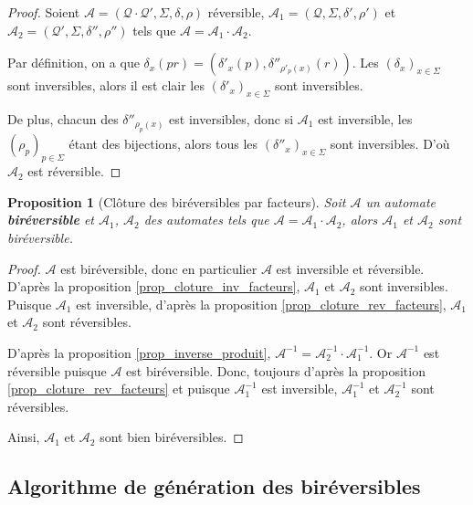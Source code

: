 \documentclass[11pt,a4paper]{article}
\newtheorem{prop}{Proposition}
\begin{document}
\begin{proof}
  Soient $\mathcal{A}=\left(\mathcal{Q\cdot Q'}, \Sigma, \delta, \rho\right)$ réversible, $\mathcal{A}_1=\left(\mathcal{Q}, \Sigma, \delta', \rho'\right)$ et $\mathcal{A}_2=\left(\mathcal{Q'}, \Sigma, \delta'', \rho''\right)$ tels que $\mathcal{A} = \mathcal{A}_1\cdot\mathcal{A}_2$.

  Par définition, on a que $\delta_x(pr) = (\delta'_x(p), \delta''_{\rho'_p(x)}(r))$. Les ${(\delta_x)}_{x\in\Sigma}$ sont inversibles, alors il est clair les ${(\delta'_x)}_{x\in\Sigma}$ sont inversibles.

  De plus, chacun des $\delta''_{\rho_p(x)}$ est inversibles, donc si $\mathcal{A}_1$ est inversible, les ${(\rho_p)}_{p\in\Sigma}$ étant des bijections, alors tous les ${(\delta''_x)}_{x\in\Sigma}$ sont inversibles. D'où $\mathcal{A}_2$ est réversible.
\end{proof}

\begin{prop}[Clôture des biréversibles par facteurs]
  Soit $\mathcal{A}$ un automate \textbf{biréversible} et $\mathcal{A}_1$, $\mathcal{A}_2$ des automates tels que $\mathcal{A}=\mathcal{A}_1\cdot\mathcal{A}_2$, alors $\mathcal{A}_1$ et $\mathcal{A}_2$ sont biréversible.
\end{prop}

\begin{proof}
    $\mathcal{A}$ est biréversible, donc en particulier $\mathcal{A}$ est inversible et réversible. D'après la proposition \ref{prop_cloture_inv_facteurs}, $\mathcal{A}_1$ et $\mathcal{A}_2$ sont inversibles. Puisque $\mathcal{A}_1$ est inversible, d'après la proposition \ref{prop_cloture_rev_facteurs}, $\mathcal{A}_1$ et $\mathcal{A}_2$ sont réversibles.

    D'après la proposition \ref{prop_inverse_produit}, $\mathcal{A}^{-1} = \mathcal{A}_2^{-1} \cdot \mathcal{A}_1^{-1}$. Or $\mathcal{A}^{-1}$ est réversible puisque $\mathcal{A}$ est biréversible. Donc, toujours d'après la proposition \ref{prop_cloture_rev_facteurs} et puisque $\mathcal{A}_1^{-1}$ est inversible, $\mathcal{A}_1^{-1}$ et $\mathcal{A}_2^{-1}$ sont réversibles.

    Ainsi, $\mathcal{A}_1$ et $\mathcal{A}_2$ sont bien biréversibles.
\end{proof}

\subsection{Algorithme de génération des biréversibles\label{sec:gen}}
\end{document}
